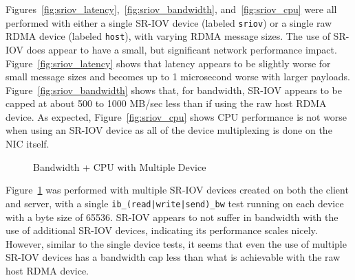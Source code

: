 \documentclass[12pt,titlepage]{article}
\begin{document}
Figures~\ref{fig:sriov_latency},~\ref{fig:sriov_bandwidth}, and~\ref{fig:sriov_cpu} were all performed with either a single SR-IOV device (labeled \texttt{sriov}) or a single raw RDMA device (labeled \texttt{host}), with varying RDMA message sizes.
The use of SR-IOV does appear to have a small, but significant network performance impact.
Figure~\ref{fig:sriov_latency} shows that latency appears to be slightly worse for small message sizes and becomes up to 1 microsecond worse with larger payloads.
Figure~\ref{fig:sriov_bandwidth} shows that, for bandwidth, SR-IOV appears to be capped at about 500 to 1000 MB/sec less than if using the raw host RDMA device.
As expected, Figure~\ref{fig:sriov_cpu} shows CPU performance is not worse when using an SR-IOV device as all of the device multiplexing is done on the NIC itself. 

\begin{figure}
	\centering
	\caption{Bandwidth + CPU with Multiple Device}%
	\label{fig:sriov_multi_vdev}
\end{figure}

Figure~\ref{fig:sriov_multi_vdev} was performed with multiple SR-IOV devices created on both the client and server, with a single \texttt{ib\_(read|write|send)\_bw} test running on each device with a byte size of 65536.
SR-IOV appears to not suffer in bandwidth with the use of additional SR-IOV devices, indicating its performance scales nicely.
However, similar to the single device tests, it seems that even the use of multiple SR-IOV devices has a bandwidth cap less than what is achievable with the raw host RDMA device.
\end{document}
